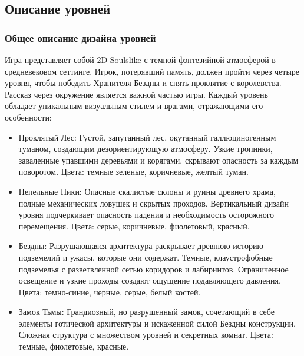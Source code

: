 \documentclass{article}
\begin{document}
\begin{itemize}
\subsection{Описание уровней}

\subsubsection{Общее описание дизайна уровней}
Игра представляет собой 2D Soulslike с темной фэнтезийной атмосферой в средневековом сеттинге. Игрок, потерявший память, должен пройти через четыре уровня, чтобы победить Хранителя Бездны и снять проклятие с королевства. Рассказ через окружение является важной частью игры. Каждый уровень обладает уникальным визуальным стилем и врагами, отражающими его особенности:
\begin{itemize}
\item Проклятый Лес: Густой, запутанный лес, окутанный галлюциногенным туманом, создающим дезориентирующую атмосферу. Узкие тропинки, заваленные упавшими деревьями и корягами, скрывают опасность за каждым поворотом. Цвета: темные зеленые, коричневые, желтый туман.
\item Пепельные Пики: Опасные скалистые склоны и руины древнего храма, полные механических ловушек и скрытых проходов. Вертикальный дизайн уровня подчеркивает опасность падения и необходимость осторожного перемещения. Цвета: серые, коричневые, фиолетовый, красный.
\item Бездны: Разрушающаяся архитектура раскрывает древнюю историю подземелий и ужасы, которые они содержат. Темные, клаустрофобные подземелья с разветвленной сетью коридоров и лабиринтов. Ограниченное освещение и узкие проходы создают ощущение подавляющего давления. Цвета: темно-синие, черные, серые, белый костей.
\item Замок Тьмы: Грандиозный, но разрушенный замок, сочетающий в себе элементы готической архитектуры и искаженной силой Бездны конструкции. Сложная структура с множеством уровней и секретных комнат. Цвета: темные, фиолетовые, красные.
\end{itemize}


\end{itemize}
\end{document}
